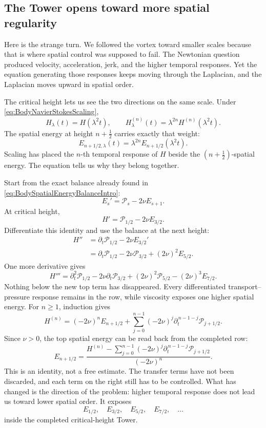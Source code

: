 \subsection{The Tower opens toward more spatial regularity}\label{sub:ThePressureCompleteMixedDerivativeTower}

Here is the strange turn.  We followed the vortex toward smaller scales
because that is where spatial control was supposed to fail.  The Newtonian
question produced velocity, acceleration, jerk, and the higher temporal
responses.  Yet the equation generating those responses keeps moving through
the Laplacian, and the Laplacian moves upward in spatial order.

The critical height lets us see the two directions on the same scale.  Under
\eqref{eq:BodyNavierStokesScaling},
\[
  H_\lambda(t)=H(\lambda^2t),
  \qquad
  H_\lambda^{(n)}(t)
  =\lambda^{2n}H^{(n)}(\lambda^2t).
\]
The spatial energy at height \(n+\tfrac12\) carries exactly that weight:
\[
  E_{n+1/2,\lambda}(t)
  =\lambda^{2n}E_{n+1/2}(\lambda^2t).
\]
Scaling has placed the \(n\)-th temporal response of \(H\) beside the
\((n+\tfrac12)\)-spatial energy.  The equation tells us why they belong
together.

Start from the exact balance already found in
\eqref{eq:BodySpatialEnergyBalanceIntro}:
\[
  E_s'=\mathcal P_s-2\nu E_{s+1}.
\]
At critical height,
\[
  H'=\mathcal P_{1/2}-2\nu E_{3/2}.
\]
Differentiate this identity and use the balance at the next height:
\[
\begin{aligned}
  H''
  &=\partial_t\mathcal P_{1/2}-2\nu E_{3/2}'
  \\
  &=\partial_t\mathcal P_{1/2}
  -2\nu\mathcal P_{3/2}
  +(2\nu)^2E_{5/2}.
\end{aligned}
\]
One more derivative gives
\[
  H'''
  =\partial_t^2\mathcal P_{1/2}
  -2\nu\partial_t\mathcal P_{3/2}
  +(2\nu)^2\mathcal P_{5/2}
  -(2\nu)^3E_{7/2}.
\]
Nothing below the new top term has disappeared.  Every differentiated
transport--pressure response remains in the row, while viscosity exposes one
higher spatial energy.  For \(n\geq1\), induction gives
\begin{equation}\label{eq:BodyCriticalHeightDiscovery}
  H^{(n)}
  =(-2\nu)^nE_{n+1/2}
  +\sum_{j=0}^{n-1}
  (-2\nu)^j
  \partial_t^{\,n-1-j}\mathcal P_{j+1/2}.
\end{equation}
Since \(\nu>0\), the top spatial energy can be read back from the completed
row:
\begin{equation}\label{eq:BodyCompletedCriticalDiscovery}
  E_{n+1/2}
  =\frac{
    H^{(n)}-
    \displaystyle\sum_{j=0}^{n-1}
    (-2\nu)^j\partial_t^{\,n-1-j}\mathcal P_{j+1/2}
  }{(-2\nu)^n}.
\end{equation}
This is an identity, not a free estimate.  The transfer terms have not been
discarded, and each term on the right still has to be controlled.  What has
changed is the direction of the problem: higher temporal response does not
lead us toward lower spatial order.  It exposes
\[
  E_{1/2},
  \quad E_{3/2},
  \quad E_{5/2},
  \quad E_{7/2},
  \quad\ldots
\]
inside the completed critical-height Tower.

